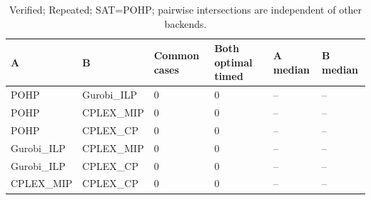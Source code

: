 \begin{table}[htbp]
\centering
\caption{Verified; Repeated; SAT=POHP; pairwise intersections are independent of other backends.}
\label{tab:p2b-Repeated-pairs}
\begin{tabular}{llllll}
\hline
A & B & Common cases & Both optimal timed & A median & B median \\
\hline
POHP & Gurobi\_ILP & 0 & 0 & -- & -- \\
POHP & CPLEX\_MIP & 0 & 0 & -- & -- \\
POHP & CPLEX\_CP & 0 & 0 & -- & -- \\
Gurobi\_ILP & CPLEX\_MIP & 0 & 0 & -- & -- \\
Gurobi\_ILP & CPLEX\_CP & 0 & 0 & -- & -- \\
CPLEX\_MIP & CPLEX\_CP & 0 & 0 & -- & -- \\
\hline
\end{tabular}
\end{table}

